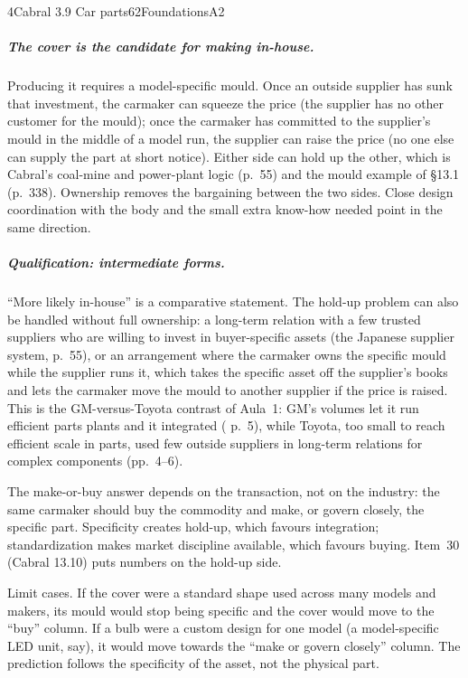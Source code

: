 \begin{exsol}{4}{Cabral 3.9 Car parts}{62}{Foundations}{A2}
\subparagraph{The cover is the candidate for making in-house.} Producing it requires a
model-specific mould. Once an outside supplier has sunk that investment, the carmaker can
squeeze the price (the supplier has no other customer for the mould); once the carmaker has
committed to the supplier's mould in the middle of a model run, the supplier can raise the price
(no one else can supply the part at short notice). Either side can hold up the other, which is
Cabral's coal-mine and power-plant logic (p.~55) and the mould example of \S13.1 (p.~338).
Ownership removes the bargaining between the two sides. Close design coordination with the body
and the small extra know-how needed point in the same direction.

\subparagraph{Qualification: intermediate forms.} ``More likely in-house'' is a comparative
statement. The hold-up problem can also be handled without full ownership: a long-term
relation with a few trusted suppliers who are willing to invest in buyer-specific assets (the
Japanese supplier system, p.~55), or an arrangement where the carmaker owns the specific mould
while the supplier runs it, which takes the specific asset off the supplier's books and lets the
carmaker move the mould to another supplier if the price is raised. This is the
GM-versus-Toyota contrast of Aula~1: GM's volumes let it run efficient parts plants and it
integrated (\MR{} p.~5), while Toyota, too small to reach efficient scale in parts, used few
outside suppliers in long-term relations for complex components (pp.~4--6).

\interp The make-or-buy answer depends on the transaction, not on the industry: the same
carmaker should buy the commodity and make, or govern closely, the specific part. Specificity
creates hold-up, which favours integration; standardization makes market discipline available,
which favours buying. Item~30 (Cabral 13.10) puts numbers on the hold-up side.

\verify Limit cases. If the cover were a standard shape used across many models and makers, its
mould would stop being specific and the cover would move to the ``buy'' column. If a bulb were a
custom design for one model (a model-specific LED unit, say), it would move towards the ``make or
govern closely'' column. The prediction follows the specificity of the asset, not the physical
part.

\end{exsol}
